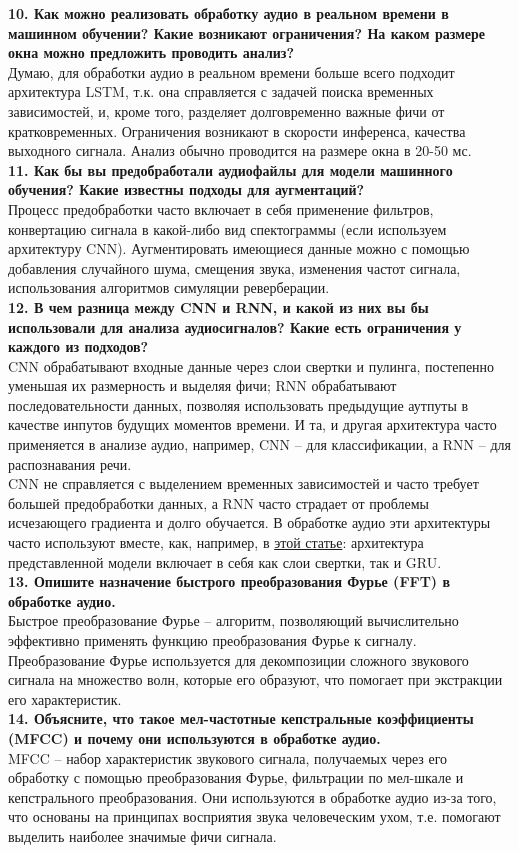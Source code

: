 \documentclass[12pt]{article}
\begin{document}
\textbf{10. Как можно реализовать обработку аудио в реальном времени в машинном обучении? Какие возникают ограничения? На каком размере окна можно предложить проводить анализ?}\\
Думаю, для обработки аудио в реальном времени больше всего подходит архитектура LSTM, т.к. она справляется с задачей поиска временных зависимостей, и, кроме того, разделяет долговременно важные фичи от кратковременных. Ограничения возникают в скорости инференса, качества выходного сигнала. Анализ обычно проводится на размере окна в 20-50 мс.\\

\textbf{11. Как бы вы предобработали аудиофайлы для модели машинного обучения? Какие известны подходы для аугментаций?}\\
Процесс предобработки часто включает в себя применение фильтров, конвертацию сигнала в какой-либо вид спектограммы (если используем архитектуру CNN). Аугментировать имеющиеся данные можно с помощью добавления случайного шума, смещения звука, изменения частот сигнала, использования алгоритмов симуляции реверберации.\\

\textbf{12. В чем разница между CNN и RNN, и какой из них вы бы использовали для анализа аудиосигналов? Какие есть ограничения у каждого из подходов?}\\
CNN обрабатывают входные данные через слои свертки и пулинга, постепенно уменьшая их размерность и выделяя фичи; RNN обрабатывают последовательности данных, позволяя использовать предыдущие аутпуты в качестве инпутов будущих моментов времени. И та, и другая архитектура часто применяется в анализе аудио, например, CNN -- для классификации, а RNN -- для распознавания речи.\\
CNN не справляется с выделением временных зависимостей и часто требует большей предобработки данных, а RNN часто страдает от проблемы исчезающего градиента и долго обучается. В обработке аудио эти архитектуры часто используют вместе, как, например, в \href{https://arxiv.org/pdf/2306.03177v1}{этой статье}: архитектура представленной модели включает в себя как слои свертки, так и GRU.\\

\textbf{13. Опишите назначение быстрого преобразования Фурье (FFT) в обработке аудио.}\\
Быстрое преобразование Фурье -- алгоритм, позволяющий вычислительно эффективно применять функцию преобразования Фурье к сигналу. Преобразование Фурье используется для декомпозиции сложного звукового сигнала на множество волн, которые его образуют, что помогает при экстракции его характеристик.\\

\textbf{14. Объясните, что такое мел-частотные кепстральные коэффициенты (MFCC) и почему они используются в обработке аудио.}\\
MFCC -- набор характеристик звукового сигнала, получаемых через его обработку с помощью преобразования Фурье, фильтрации по мел-шкале и кепстрального преобразования. Они используются в обработке аудио из-за того, что основаны на принципах восприятия звука человеческим ухом, т.е. помогают выделить наиболее значимые фичи сигнала.
\end{document}
